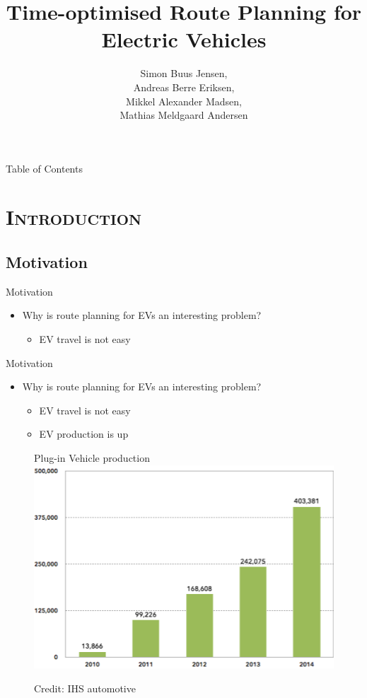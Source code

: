 
\begin{frame}
\title{\huge Time-optimised Route Planning for Electric Vehicles}
\author{
 Simon Buus Jensen,\\
 Andreas Berre Eriksen,\\
 Mikkel Alexander Madsen,\\
 Mathias Meldgaard Andersen\\
}
\titlepage
\end{frame}

\begin{frame}{Table of Contents}
\tableofcontents
\end{frame}

\section{\scshape Introduction}
\subsection{Motivation}

\begin{frame}{Motivation}
\begin{itemize}
\item Why is route planning for EVs an interesting problem?
\begin{itemize}
\item EV travel is not easy
\end{itemize}
\end{itemize}
\vspace{20cm}
\end{frame}

\begin{frame}{Motivation}
\begin{itemize}
\item Why is route planning for EVs an interesting problem?
\begin{itemize}
\item EV travel is not easy
\item EV production is up
\end{itemize}
\end{itemize}
\begin{figure}[h!]
  \centering
  Plug-in Vehicle production
    \includegraphics[height=0.4\textwidth]{images/forecast}
  
      \tiny Credit: IHS automotive
\end{figure}
\vspace{20cm}
\end{frame}

